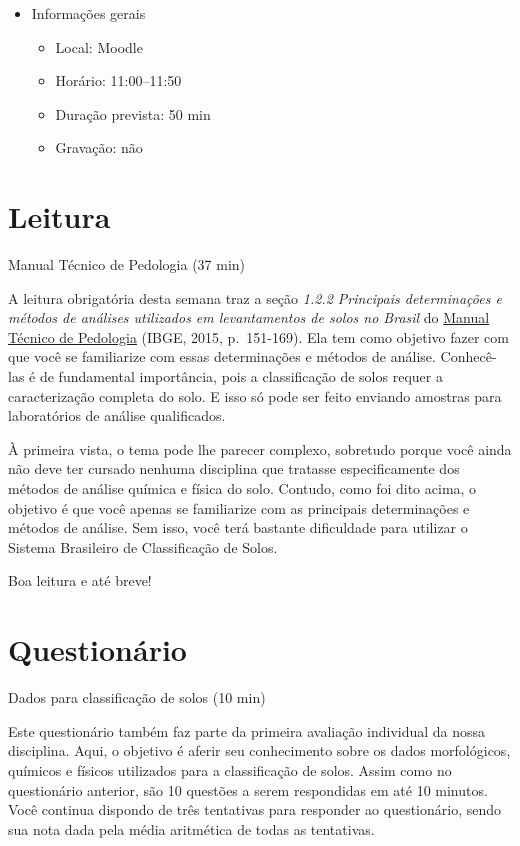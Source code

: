 \documentclass[
  11pt,
  a4paper,
  dvipsnames]{tufte-book}
\providecommand{\tightlist}{%
  \setlength{\itemsep}{0pt}\setlength{\parskip}{0pt}}
\begin{document}
\begin{itemize}
\tightlist
\item
  Informações gerais

  \begin{itemize}
  \tightlist
  \item
    Local: Moodle
  \item
    Horário: 11:00--11:50
  \item
    Duração prevista: 50 min
  \item
    Gravação: não
  \end{itemize}
\end{itemize}

\hypertarget{leitura}{%
\section{Leitura}\label{leitura}}

Manual Técnico de Pedologia (37 min)

A leitura obrigatória desta semana traz a seção \emph{1.2.2 Principais determinações e métodos de análises utilizados em levantamentos de solos no Brasil} do \href{https://biblioteca.ibge.gov.br/visualizacao/livros/liv95017.pdf}{Manual Técnico de Pedologia} (IBGE, 2015, p.~151-169). Ela tem como objetivo fazer com que você se familiarize com essas determinações e métodos de análise. Conhecê-las é de fundamental importância, pois a classificação de solos requer a caracterização completa do solo. E isso só pode ser feito enviando amostras para laboratórios de análise qualificados.

À primeira vista, o tema pode lhe parecer complexo, sobretudo porque você ainda não deve ter cursado nenhuma disciplina que tratasse especificamente dos métodos de análise química e física do solo. Contudo, como foi dito acima, o objetivo é que você apenas se familiarize com as principais determinações e métodos de análise. Sem isso, você terá bastante dificuldade para utilizar o Sistema Brasileiro de Classificação de Solos.

Boa leitura e até breve!

\hypertarget{questionuxe1rio-1}{%
\section{Questionário}\label{questionuxe1rio-1}}

Dados para classificação de solos (10 min)

Este questionário também faz parte da primeira avaliação individual da nossa disciplina. Aqui, o objetivo é aferir seu conhecimento sobre os dados morfológicos, químicos e físicos utilizados para a classificação de solos. Assim como no questionário anterior, são 10 questões a serem respondidas em até 10 minutos. Você continua dispondo de três tentativas para responder ao questionário, sendo sua nota dada pela média aritmética de todas as tentativas.
\end{document}
